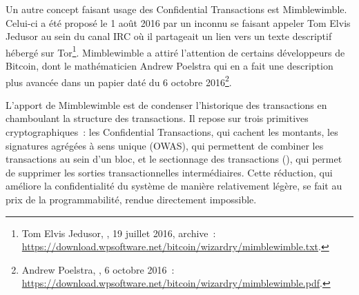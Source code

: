 Un autre concept faisant usage des Confidential Transactions est Mimblewimble. Celui-ci a été proposé le 1\ier{} août 2016 par un inconnu se faisant appeler Tom Elvis Jedusor au sein du canal IRC  où il partageait un lien vers un texte descriptif hébergé sur Tor\footnote{Tom Elvis Jedusor, , 19 juillet 2016, archive~: \url{https://download.wpsoftware.net/bitcoin/wizardry/mimblewimble.txt}.}. Mimblewimble a attiré l'attention de certains développeurs de Bitcoin, dont le mathématicien Andrew Poelstra qui en a fait une description plus avancée dans un papier daté du 6 octobre 2016\footnote{Andrew Poelstra, , 6 octobre 2016~: \url{https://download.wpsoftware.net/bitcoin/wizardry/mimblewimble.pdf}.}.

L'apport de Mimblewimble est de condenser l'historique des transactions en chamboulant la structure des transactions. Il repose sur trois primitives cryptographiques~: les Confidential Transactions, qui cachent les montants, les signatures agrégées à sens unique (OWAS), qui permettent de combiner les transactions au sein d'un bloc, et le sectionnage des transactions (), qui permet de supprimer les sorties transactionnelles intermédiaires. Cette réduction, qui améliore la confidentialité du système de manière relativement légère, se fait au prix de la programmabilité, rendue directement impossible.

